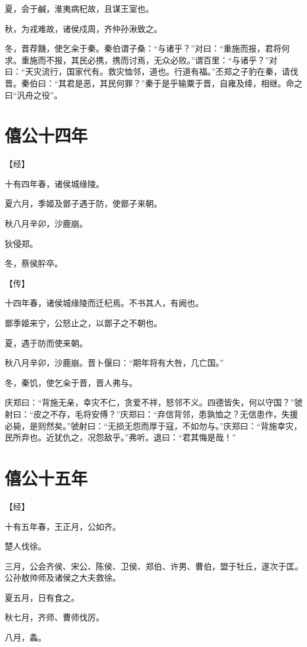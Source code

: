 \documentclass[a4paper,12pt,UTF8,twoside]{ctexbook}
\begin{document}
夏，会于鹹，淮夷病杞故，且谋王室也。

秋，为戎难故，诸侯戍周，齐仲孙湫致之。

冬，晋荐饑，使乞籴于秦。秦伯谓子桑：“与诸乎？”对曰：“重施而报，君将何求。重施而不报，其民必携，携而讨焉，无众必败。”谓百里：“与诸乎？”对曰：“天灾流行，国家代有。救灾恤邻，道也。行道有福。”丕郑之子豹在秦，请伐晋。秦伯曰：“其君是恶，其民何罪？”秦于是乎输粟于晋，自雍及绛，相继。命之曰“汎舟之役”。

\chapter{僖公十四年}



【经】

十有四年春，诸侯城缘陵。

夏六月，季姬及鄫子遇于防，使鄫子来朝。

秋八月辛卯，沙鹿崩。

狄侵郑。

冬，蔡侯肸卒。

【传】

十四年春，诸侯城缘陵而迁杞焉。不书其人，有阙也。

鄫季姬来宁，公怒止之，以鄫子之不朝也。

夏，遇于防而使来朝。

秋八月辛卯，沙鹿崩。晋卜偃曰：“期年将有大咎，几亡国。”

冬，秦饥，使乞籴于晋，晋人弗与。

庆郑曰：“背施无亲，幸灾不仁，贪爱不祥，怒邻不义。四德皆失，何以守国？”虢射曰：“皮之不存，毛将安傅？”庆郑曰：“弃信背邻，患孰恤之？无信患作，失援必毙，是则然矣。”虢射曰：“无损无怨而厚于寇，不如勿与。”庆郑曰：“背施幸灾，民所弃也。近犹仇之，况怨敌乎。”弗听。退曰：“君其悔是哉！”

\chapter{僖公十五年}



【经】

十有五年春，王正月，公如齐。

楚人伐徐。

三月，公会齐侯、宋公、陈侯、卫侯、郑伯、许男、曹伯，盟于牡丘，遂次于匡。公孙敖帅师及诸侯之大夫救徐。

夏五月，日有食之。

秋七月，齐师、曹师伐厉。

八月，螽。
\end{document}
